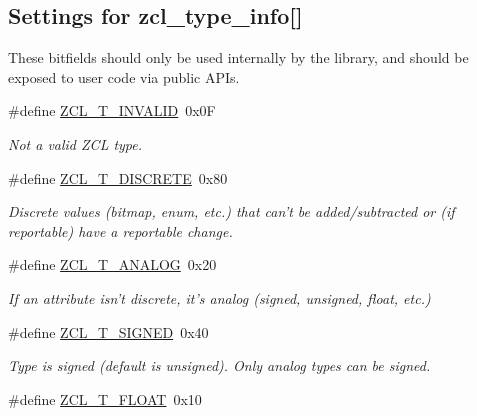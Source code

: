 \subsection*{Settings for zcl\-\_\-type\-\_\-info\mbox{[}\mbox{]}}
\label{_amgrpc5b79f6c3ee6519b88128e632fa3f35f}%
These bitfields should only be used internally by the library, and should be exposed to user code via public A\-P\-Is. \begin{DoxyCompactItemize}
\item 
\hypertarget{group__zcl__types_ga7609ed68cf4399cb2c09799ecedfdbe0}{\#define \hyperlink{group__zcl__types_ga7609ed68cf4399cb2c09799ecedfdbe0}{Z\-C\-L\-\_\-\-T\-\_\-\-I\-N\-V\-A\-L\-I\-D}~0x0\-F}\label{group__zcl__types_ga7609ed68cf4399cb2c09799ecedfdbe0}

\begin{DoxyCompactList}\small\item\em Not a valid Z\-C\-L type. \end{DoxyCompactList}\item 
\#define \hyperlink{group__zcl__types_ga3e9bf95af4f58a0c9c5c34639b0dda29}{Z\-C\-L\-\_\-\-T\-\_\-\-D\-I\-S\-C\-R\-E\-T\-E}~0x80
\begin{DoxyCompactList}\small\item\em Discrete values (bitmap, enum, etc.) that can't be added/subtracted or (if reportable) have a reportable change. \end{DoxyCompactList}\item 
\hypertarget{group__zcl__types_ga7b609984d4662f83a2248d1f485fd4ad}{\#define \hyperlink{group__zcl__types_ga7b609984d4662f83a2248d1f485fd4ad}{Z\-C\-L\-\_\-\-T\-\_\-\-A\-N\-A\-L\-O\-G}~0x20}\label{group__zcl__types_ga7b609984d4662f83a2248d1f485fd4ad}

\begin{DoxyCompactList}\small\item\em If an attribute isn't discrete, it's analog (signed, unsigned, float, etc.) \end{DoxyCompactList}\item 
\hypertarget{group__zcl__types_gaacf8dcd439ce0388d90681aec545e4e3}{\#define \hyperlink{group__zcl__types_gaacf8dcd439ce0388d90681aec545e4e3}{Z\-C\-L\-\_\-\-T\-\_\-\-S\-I\-G\-N\-E\-D}~0x40}\label{group__zcl__types_gaacf8dcd439ce0388d90681aec545e4e3}

\begin{DoxyCompactList}\small\item\em Type is signed (default is unsigned). Only analog types can be signed. \end{DoxyCompactList}\item 
\hypertarget{group__zcl__types_gaad99789b034d1ed0a2825e075bba62af}{\#define \hyperlink{group__zcl__types_gaad99789b034d1ed0a2825e075bba62af}{Z\-C\-L\-\_\-\-T\-\_\-\-F\-L\-O\-A\-T}~0x10}\label{group__zcl__types_gaad99789b034d1ed0a2825e075bba62af}


\end{DoxyCompactItemize}
